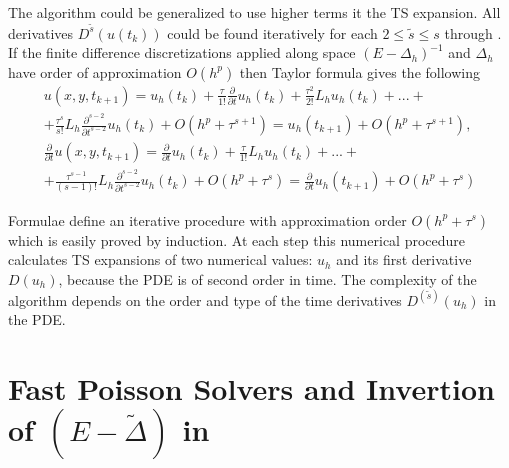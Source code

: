 \documentclass[11pt,a4paper,twoside]{article}
\begin{document}
The algorithm could be generalized to use higher terms it the TS expansion. All derivatives $D^{\tilde s}(u(t_k))$ could be found iteratively for each $2 \leq \tilde s \leq s$ through . If the finite difference discretizations applied along space $(E - \Delta_h)^{-1}$ and $\Delta_h$ have order of approximation $O(h^p)$ then Taylor formula gives the following
\begin{align} \label{GeneralIt}
u(x,y,t_{k+1}) = u_h(t_k) + \frac{\tau } {1!}  \frac{\partial}{\partial t} u_h(t_k) + \frac{ \tau^2} { 2!}L_h u_h(t_k) +... + \nonumber
\\ + \frac{\tau^s}{ s! }L_h \frac{\partial^{s-2}}{\partial t^{s-2}} u_h(t_k) + O(h^p + \tau^{s+1}) = u_h(t_{k+1}) + O(h^p + \tau^{s+1}), \nonumber
\\  \frac{\partial}{\partial t}u(x,y,t_{k+1}) = \frac{\partial}{\partial t} u_h(t_k) + \frac{\tau } {1!}  L_h u_h(t_k) + ... + \nonumber
\\ + \frac{\tau^{s-1}}{ (s-1)! } L_h \frac{\partial^{s-2} }{\partial t^{s-2}} u_h(t_k)  + O(h^p + \tau^s) = \frac{\partial}{\partial t}u_h(t_{k+1}) + O(h^p + \tau^s)
\end{align}

Formulae  define an iterative procedure with approximation order $O(h^p + \tau^s)$ which is easily proved by induction. At each step this numerical procedure calculates TS expansions of two numerical values: $u_h$ and its first derivative $D(u_h)$, because the PDE is of second order in time. The complexity of the algorithm depends on the order and type of the time derivatives $D^{(\tilde s)}(u_h)$ in the PDE.

\section{Fast Poisson Solvers and Invertion of $(E-\tilde \Delta)$ in }\label{FPSsection}
\end{document}
